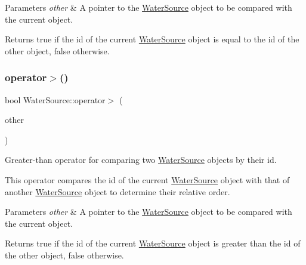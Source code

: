 \begin{DoxyParams}{Parameters}
{\em other} & A pointer to the {\ttfamily \mbox{\hyperlink{classWaterSource}{Water\+Source}}} object to be compared with the current object.\\
\hline
\end{DoxyParams}
\begin{DoxyReturn}{Returns}
{\ttfamily true} if the {\ttfamily id} of the current {\ttfamily \mbox{\hyperlink{classWaterSource}{Water\+Source}}} object is equal to the {\ttfamily id} of the {\ttfamily other} object, {\ttfamily false} otherwise. 
\end{DoxyReturn}
\mbox{\label{classWaterSource_a9db800769891e1f49d74a78298f4dac1}} 
\subsubsection{\texorpdfstring{operator$>$()}{operator>()}}
{\footnotesize\ttfamily bool Water\+Source\+::operator$>$ (\begin{DoxyParamCaption}\item[{const \mbox{\hyperlink{classWaterSource}{Water\+Source}} $\ast$}]{other }\end{DoxyParamCaption})}



Greater-\/than operator for comparing two {\ttfamily \mbox{\hyperlink{classWaterSource}{Water\+Source}}} objects by their {\ttfamily id}. 

This operator compares the {\ttfamily id} of the current {\ttfamily \mbox{\hyperlink{classWaterSource}{Water\+Source}}} object with that of another {\ttfamily \mbox{\hyperlink{classWaterSource}{Water\+Source}}} object to determine their relative order.


\begin{DoxyParams}{Parameters}
{\em other} & A pointer to the {\ttfamily \mbox{\hyperlink{classWaterSource}{Water\+Source}}} object to be compared with the current object.\\
\hline
\end{DoxyParams}
\begin{DoxyReturn}{Returns}
{\ttfamily true} if the {\ttfamily id} of the current {\ttfamily \mbox{\hyperlink{classWaterSource}{Water\+Source}}} object is greater than the {\ttfamily id} of the {\ttfamily other} object, {\ttfamily false} otherwise. 
\end{DoxyReturn}
\mbox{\label{classWaterSource_aebc6985952d3e69f0d8ae1d0498a1ffe}} 
